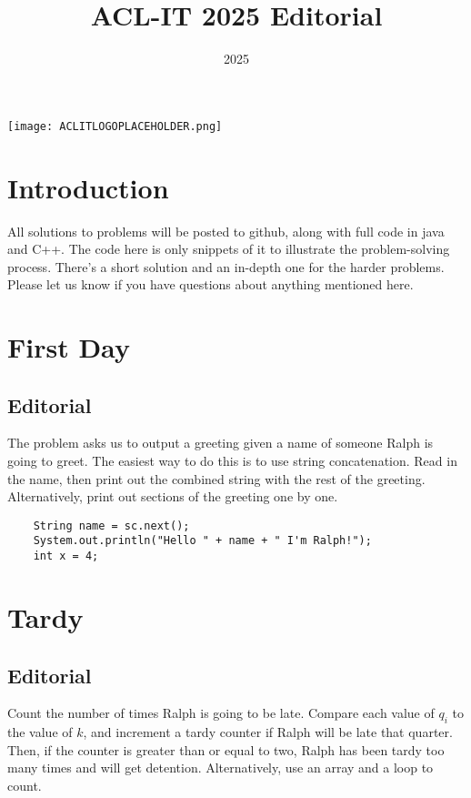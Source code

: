 \documentclass{article}
\title{ACL-IT 2025 Editorial}
\author{} %
\date{2025}
\begin{document}
\maketitle
\begin{center}
    \vfill
    \texttt{[image: ACLITLOGOPLACEHOLDER.png]}
    \vfill
\end{center}



\newpage

\tableofcontents

\section*{Introduction}
All solutions to problems will be posted to github, along with full code in java and C++. The code here is only snippets of it to illustrate the problem-solving process. There's a short solution and an in-depth one for the harder problems. Please let us know if you have questions about anything mentioned here.

\section{First Day}
\subsection{Editorial}
The problem asks us to output a greeting given a name of someone Ralph is going to greet. The easiest way to do this is to use string concatenation. Read in the name, then print out the combined string with the rest of the greeting. Alternatively, print out sections of the greeting one by one.

\begin{lstlisting}
    String name = sc.next();
    System.out.println("Hello " + name + " I'm Ralph!");
    int x = 4;
\end{lstlisting}


\section{Tardy}
\subsection{Editorial}
Count the number of times Ralph is going to be late. Compare each value of $q_i$ to the value of $k$, and increment a tardy counter if Ralph will be late that quarter. Then, if the counter is greater than or equal to two, Ralph has been tardy too many times and will get detention. Alternatively, use an array and a loop to count.
\end{document}

